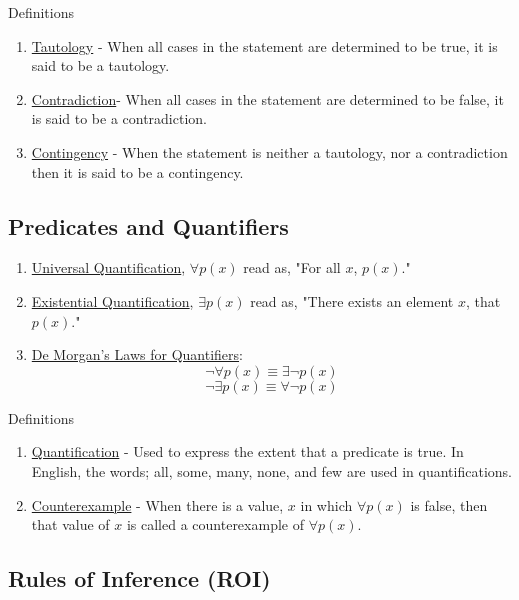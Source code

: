 \documentclass[12pt]{article}
\begin{document}
Definitions
\begin{enumerate}
\item \underline{Tautology} - When all cases in the statement are determined to be true, it is said to be a tautology.
\item \underline{Contradiction}- When all cases in the statement are determined to be false, it is said to be a contradiction.
\item \underline{Contingency} - When the statement is neither a tautology, nor a contradiction then it is said to be a contingency.
\end{enumerate}

\quad

\quad

\subsection{Predicates and Quantifiers}

\quad 

\begin{enumerate}
\item \underline{Universal Quantification}, $\forall p(x)$ read as, "For all $x$, $p(x)$."
\item \underline{Existential Quantification}, $\exists p(x)$ read as, "There exists an element $x$, that $p(x)$."
\item \underline{De Morgan's Laws for Quantifiers}:
\[
	\neg \forall p(x) \equiv \exists \neg p(x)
\]
\[
	\neg \exists p(x) \equiv \forall \neg p(x)
\]
\end{enumerate}

Definitions
\begin{enumerate}
\item \underline{Quantification} - Used to express the extent that a predicate is true. In English, the words; all, some, many, none, and few are used in quantifications.
\item \underline{Counterexample} - When there is a value, $x$ in which $\forall p(x)$ is false, then that value of $x$ is called a counterexample of $\forall p(x)$.
\end{enumerate}

\pagebreak

\subsection{Rules of Inference (ROI)}

\quad 
\end{document}
